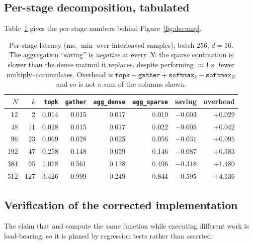 \subsection{Per-stage decomposition, tabulated}
\label{app:decomp}

Table~\ref{tab:decomp} gives the per-stage numbers behind
Figure~\ref{fig:decomp}.

\begin{table}[ht]
\centering
\small
\caption{Per-stage latency (ms, $\min$ over interleaved samples), batch $256$,
$d{=}16$. The aggregation ``saving'' is \emph{negative} at every $N$: the
sparse contraction is slower than the dense matmul it replaces, despite
performing $\approx4\times$ fewer multiply--accumulates. Overhead is
$\texttt{topk} + \texttt{gather} + \texttt{softmax}_k - \texttt{softmax}_N$ and
so is not a sum of the columns shown.}
\label{tab:decomp}
\begin{tabular}{rrrrrrrr}
\toprule
$N$ & $k$ & \texttt{topk} & \texttt{gather} & \texttt{agg\_dense} & \texttt{agg\_sparse} & saving & overhead \\
\midrule
12  & 2   & 0.014 & 0.015 & 0.017 & 0.019 & $-0.003$ & $+0.029$ \\
48  & 11  & 0.028 & 0.015 & 0.017 & 0.022 & $-0.005$ & $+0.042$ \\
96  & 23  & 0.069 & 0.028 & 0.025 & 0.056 & $-0.031$ & $+0.095$ \\
192 & 47  & 0.258 & 0.148 & 0.059 & 0.146 & $-0.087$ & $+0.383$ \\
384 & 95  & 1.078 & 0.561 & 0.178 & 0.496 & $-0.318$ & $+1.480$ \\
512 & 127 & 3.426 & 0.999 & 0.249 & 0.844 & $-0.595$ & $+4.136$ \\
\bottomrule
\end{tabular}
\end{table}

\subsection{Verification of the corrected implementation}
\label{app:verification}

The claim that \Gath{} and \Mask{} compute the same function while executing
different work is load-bearing, so it is pinned by regression tests rather than
asserted:

